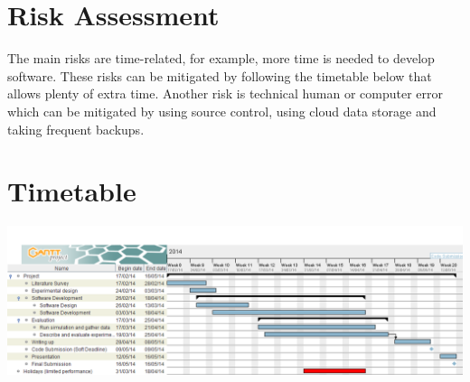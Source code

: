 \documentclass[a4paper,12pt]{article}
\begin{document}
\section*{Risk Assessment}
The main risks are time-related, for example, more time is needed to develop software. These risks can be mitigated by following the timetable below that allows plenty of extra time. Another risk is technical human or computer error which can be mitigated by using source control, using cloud data storage and taking frequent backups.

\section*{Timetable}
\includegraphics[width=\textwidth]{gantt}


\printbibliography
\end{document}
